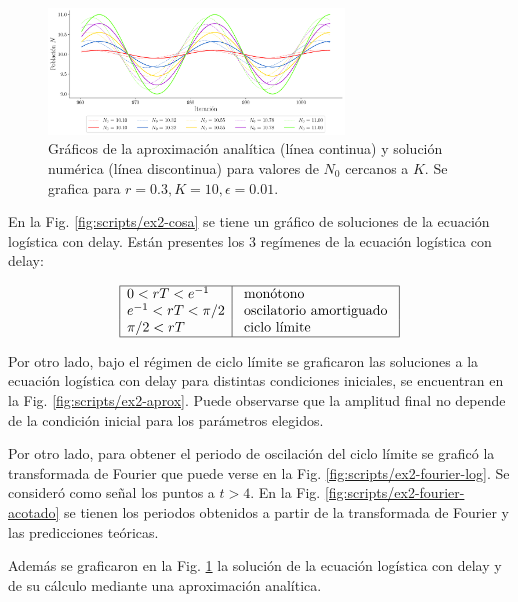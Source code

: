 \documentclass[twocolumn,aps,prl]{revtex4-1}
\begin{document}
\begin{figure}[ht!]
    \centering
        \centering
        \includegraphics[width = 0.7\textwidth]{scripts/ex2-cosaPrueba.pdf}
        \caption{Gráficos de la aproximación analítica (línea continua) y solución numérica (línea discontinua) para valores de $N_0$ cercanos a $K$. Se grafica para $r = 0.3, K=10, \epsilon = 0.01$.}
        \label{fig:scripts/ex2-cosaPrueba}
\end{figure}

En la Fig. \ref{fig:scripts/ex2-cosa} se tiene un gráfico de soluciones de la ecuación logística con delay. Están presentes los 3 regímenes de la ecuación logística con delay:

$$
\begin{array}{|l|l|}
\hline 0<r T <e^{-1} & \text { monótono } \\
e^{-1}<r T <\pi / 2 & \text { oscilatorio amortiguado } \\
\pi / 2<r T  & \text { ciclo límite } \\
\hline
\end{array}
$$

Por otro lado, bajo el régimen de ciclo límite se graficaron las soluciones a la ecuación logística con delay para distintas condiciones iniciales, se encuentran en la Fig. \ref{fig:scripts/ex2-aprox}. Puede observarse que la amplitud final no depende de la condición inicial para los parámetros elegidos.

Por otro lado, para obtener el periodo de oscilación del ciclo límite se graficó la transformada de Fourier que puede verse en la Fig. \ref{fig:scripts/ex2-fourier-log}. Se consideró como señal los puntos a $t>4$. En la Fig. \ref{fig:scripts/ex2-fourier-acotado} se tienen los periodos obtenidos a partir de la transformada de Fourier y las predicciones teóricas.

Además se graficaron en la Fig. \ref{fig:scripts/ex2-cosaPrueba} la solución de la ecuación logística con delay y de su cálculo mediante una aproximación analítica.
\end{document}
